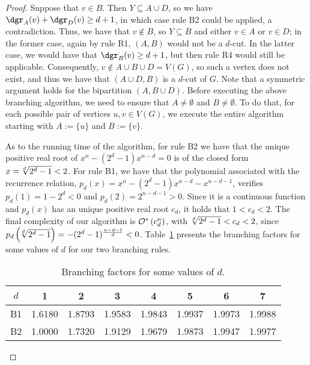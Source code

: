 \begin{proof}
    Suppose that $v \in B$. Then $Y \subseteq A \cup D$, so we have $\dgr_A(v) + \dgr_D(v) \geq d+1$, in which case rule B2 could be applied, a contradiction.
    Thus, we have that $v \notin B$, so $Y \subseteq B$ and either $v \in A$ or $v \in D$;
    in the former case, again by rule R1, $(A, B)$ would not be a $d$-cut.
     In the latter case, we would have that $\dgr_B(v) \geq d+1$, but then rule R4 would still be applicable.
    Consequently, $v \notin A \cup B \cup D = V(G)$, so such a vertex does not exist, and thus we have that $(A \cup D, B)$ is a $d$-cut of $G$.
    Note that a symmetric argument holds for the bipartition $(A, B \cup D)$.
    Before executing the above branching algorithm, we need to ensure that $A \neq \emptyset$ and $B \neq \emptyset$.
    To do that, for each possible pair of vertices $u,v \in V(G)$, we execute the entire algorithm starting with $A := \{u\}$ and $B := \{v\}$.

    As to the running time of the algorithm, for rule B2 we have that the unique positive real root of $x^n - (2^d - 1)x^{n - d} = 0$ is of the closed form $x = \sqrt[\leftroot{2}d]{2^d - 1} < 2$.
    For rule B1, we have that the polynomial associated with the recurrence relation, $p_d(x) = x^n - (2^d - 1)x^{n - d} - x^{n - d - 1}$, verifies $p_d(1) = 1 - 2^d < 0$ and $p_d(2) = 2^{n - d - 1} > 0$.
    Since it is a continuous function and $p_d(x)$ has an unique positive real root $c_d$, it holds that $1 < c_d < 2$.
    The final complexity of our algorithm is $\mathcal{O}^*\left(c_d^n\right)$, with $\sqrt[\leftroot{2}d]{2^d - 1} < c_d < 2$, since $p_d\left(\sqrt[\leftroot{2}d]{2^d - 1}\right) = -(2^d - 1)^{\frac{n-d-1}{d}} < 0$.
    Table~\ref{tab:exact_values} presents the branching factors for some values of $d$ for our two branching rules.

\begin{table}[!htb]
    \centering
    \begin{tabular}{c|ccccccc}
         $d$ & 1 & 2 & 3 & 4 & 5 & 6 & 7\\
         \hline
         B1 & 1.6180 & 1.8793 & 1.9583 & 1.9843 & 1.9937 & 1.9973 & 1.9988 \\
         B2 & 1.0000 & 1.7320 & 1.9129 & 1.9679 & 1.9873 & 1.9947 & 1.9977 \\

    \end{tabular}\smallskip
    \caption{\centering Branching factors for some values of $d$.}
    \label{tab:exact_values}
\end{table}
\end{proof} 
